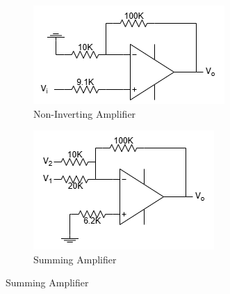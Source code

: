\begin{figure}[H]
            \begin{subfigure}{0.4\textwidth}
                \includegraphics[width=1\linewidth]{Experiment_10/Circuit/Lab10c.drawio.png}
                \caption{Non-Inverting Amplifier}
                \label{cir:NInvAmp}
            \end{subfigure}
            \begin{subfigure}{0.4\textwidth}
                \includegraphics[width=1\linewidth]{Experiment_10/Circuit/Lab10d.drawio.png}
                \caption{Summing Amplifier}
                \label{cir:SumAmp}
            \end{subfigure}


\end{figure}
